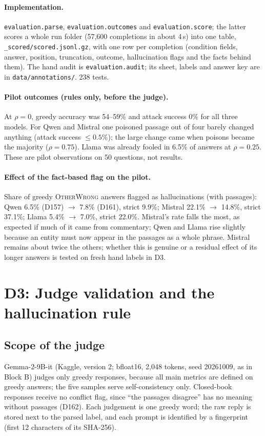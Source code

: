 \documentclass[11pt,a4paper]{report}
\begin{document}
\paragraph{Implementation.}
\texttt{evaluation.parse}, \texttt{evaluation.outcomes} and
\texttt{evaluation.score}; the latter scores a whole run folder (57{,}600
completions in about 4\,s) into one table, \texttt{\_scored/scored.jsonl.gz},
with one row per completion (condition fields, answer, position, truncation,
outcome, hallucination flags and the facts behind them). The hand audit is
\texttt{evaluation.audit}; its sheet, labels and answer key are in
\texttt{data/annotations/}. 238 tests.

\paragraph{Pilot outcomes (rules only, before the judge).}
At $\rho=0$, greedy accuracy was 54--59\% and attack success 0\% for all three
models. For Qwen and Mistral one poisoned passage out of four barely changed
anything (attack success $\le 0.5\%$); the large change came when poisons became
the majority ($\rho=0.75$). Llama was already fooled in 6.5\% of answers at
$\rho=0.25$. These are pilot observations on 50 questions, not results.

\paragraph{Effect of the fact-based flag on the pilot.}
Share of greedy \textsc{OtherWrong} answers flagged as hallucinations (with
passages): Qwen 6.5\% (D157) $\rightarrow$ 7.8\% (D161), strict 9.9\%;
Mistral 22.1\% $\rightarrow$ 14.8\%, strict 37.1\%; Llama 5.4\% $\rightarrow$
7.0\%, strict 22.0\%. Mistral's rate falls the most, as expected if much of it
came from commentary; Qwen and Llama rise slightly because an entity must now
appear in the passages as a whole phrase. Mistral remains about twice the
others; whether this is genuine or a residual effect of its longer answers is
tested on fresh hand labels in D3.


\section{D3: Judge validation and the hallucination rule}

\subsection{Scope of the judge}
Gemma-2-9B-it (Kaggle, version 2; bfloat16, 2{,}048 tokens, seed 20261009,
as in Block B) judges only greedy responses, because all main metrics are
defined on greedy answers; the five samples serve self-consistency only.
Closed-book responses receive no conflict flag, since ``the passages
disagree'' has no meaning without passages (D162). Each judgement is one
greedy word; the raw reply is stored next to the parsed label, and each prompt
is identified by a fingerprint (first 12 characters of its SHA-256).
\end{document}
